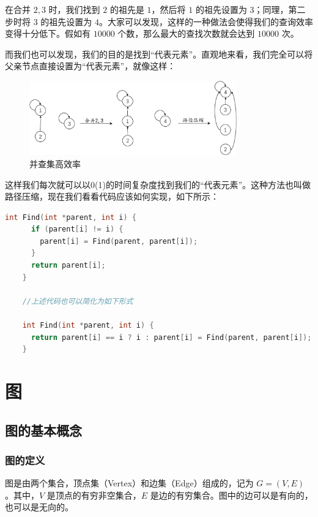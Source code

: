 \documentclass[lang=cn,newtx,10pt,scheme=chinese]{../elegantbook}
\begin{document}
  在合并 $2, 3$ 时，我们找到 $2$ 的祖先是 $1$，然后将 $1$ 的祖先设置为 $3$；同理，第二步时将 $3$ 的祖先设置为 $4$。大家可以发现，这样的一种做法会使得我们的查询效率变得十分低下。假如有 $10000$ 个数，那么最大的查找次数就会达到 $10000$ 次。

  而我们也可以发现，我们的目的是找到“代表元素”。直观地来看，我们完全可以将父亲节点直接设置为“代表元素”，就像这样：

  \begin{figure}[!htbp]
    \centering
    \includegraphics[width=0.8\textwidth]{./figure/pdf/cropped/pathCompress.pdf}
    \caption{并查集高效率}
    \label{fig:unionFind7}
  \end{figure}

  这样我们每次就可以以0(1)的时间复杂度找到我们的“代表元素”。这种方法也叫做路径压缩，现在我们看看代码应该如何实现，如下所示：

  \begin{lstlisting}[language=C++, caption={路径压缩}]
    int Find(int *parent, int i) {
      if (parent[i] != i) {
        parent[i] = Find(parent, parent[i]);
      }
      return parent[i];
    }

    //上述代码也可以简化为如下形式

    int Find(int *parent, int i) {
      return parent[i] == i ? i : parent[i] = Find(parent, parent[i]);
    }
  \end{lstlisting}
\chapter{图}

\section{图的基本概念}



\subsection{图的定义}
图是由两个集合，顶点集（Vertex）和边集（Edge）组成的，记为 $G = (V, E)$。其中，$V$ 是顶点的有穷非空集合，$E$ 是边的有穷集合。图中的边可以是有向的，也可以是无向的。
\end{document}
